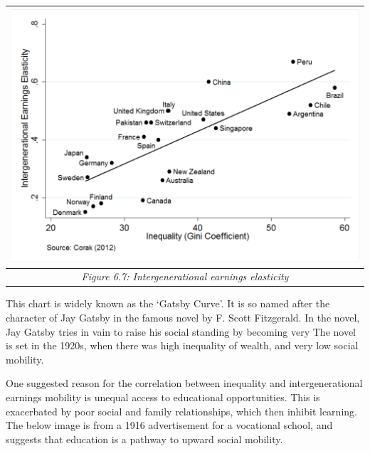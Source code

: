 \documentclass[]{tufte-handout}
\begin{document}
\begin{longtable}[]{@{}c@{}}
\toprule
\includegraphics{ChapterPictures/6-7-IntergenerationalEarningsElasticity.png}\tabularnewline
\midrule
\endhead
\emph{Figure 6.7: Intergenerational earnings elasticity}\tabularnewline
\bottomrule
\end{longtable}

This chart is widely known as the `Gatsby Curve'. It is so named after
the character of Jay Gatsby in the famous novel by F. Scott Fitzgerald.
In the novel, Jay Gatsby tries in vain to raise his social standing by
becoming very The novel is set in the 1920s, when there was high
inequality of wealth, and very low social mobility.

One suggested reason for the correlation between inequality and
intergenerational earnings mobility is unequal access to educational
opportunities. This is exacerbated by poor social and family
relationships, which then inhibit learning. The below image is from a
1916 advertisement for a vocational school, and suggests that education
is a pathway to upward social mobility.
\end{document}
